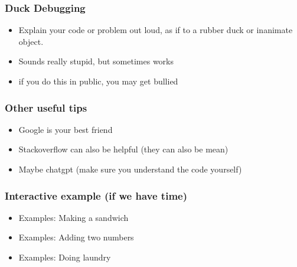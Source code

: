 \documentclass[aspectratio=169,hyperref={unicode}]{beamer}
\begin{document}
\begin{frame}
\frametitle{Duck Debugging}
\begin{itemize}
\item Explain your code or problem out loud, as if to a rubber duck or inanimate object.
        \item Sounds really stupid, but sometimes works
        \item if you do this in public, you may get bullied
\end{itemize}
\end{frame}

\begin{frame}
\frametitle{Other useful tips}
\begin{itemize}
\item Google is your best friend
        \item Stackoverflow can also be helpful (they can also be mean)
        \item Maybe chatgpt (make sure you understand the code yourself)
\end{itemize}
\end{frame}

\begin{frame}
\frametitle{Interactive example (if we have time)}
\begin{itemize}
\item Examples: Making a sandwich
\item Examples: Adding two numbers
\item Examples: Doing laundry
\end{itemize}
\end{frame}
\end{document}
